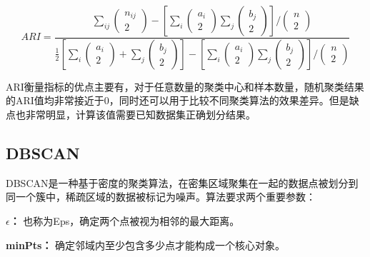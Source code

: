 \begin{equation}
	ARI = \frac{\sum_{i j}\left(\begin{array}{c}
				n_{i j} \\
				2
			\end{array}\right)-\left[\sum_i\left(\begin{array}{c}
				a_i \\
				2
			\end{array}\right) \sum_j\left(\begin{array}{c}
				b_j \\
				2
			\end{array}\right)\right] /\left(\begin{array}{c}
				n \\
				2
			\end{array}\right)}{\frac{1}{2}\left[\sum_i\left(\begin{array}{c}
				a_i \\
				2
			\end{array}\right)+\sum_j\left(\begin{array}{c}
				b_j \\
				2
			\end{array}\right)\right]-\left[\sum_i\left(\begin{array}{c}
				a_i \\
				2
			\end{array}\right) \sum_j\left(\begin{array}{c}
				b_j \\
				2
			\end{array}\right)\right] /\left(\begin{array}{c}
				n \\
				2
			\end{array}\right)}
	\label{equ_ari}
\end{equation}

ARI衡量指标的优点主要有，对于任意数量的聚类中心和样本数量，随机聚类结果的ARI值均非常接近于0，同时还可以用于比较不同聚类算法的效果差异。但是缺点也非常明显，计算该值需要已知数据集正确划分结果。


\subsection{DBSCAN}
DBSCAN是一种基于密度的聚类算法，在密集区域聚集在一起的数据点被划分到同一个簇中，稀疏区域的数据被标记为噪声\cite{khan2014dbscan}。算法要求两个重要参数：
\begin{compactitem}
	\item \textbf{$\epsilon$：} 也称为Eps，确定两个点被视为相邻的最大距离。
	\item \textbf{minPts：} 确定邻域内至少包含多少点才能构成一个核心对象。
\end{compactitem}

